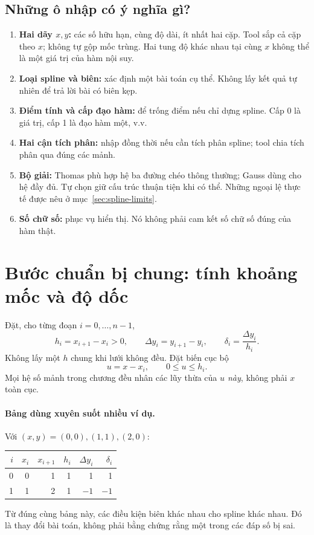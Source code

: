 \subsection{Những ô nhập có ý nghĩa gì?}
\begin{enumerate}
\item \textbf{Hai dãy $x,y$:} các số hữu hạn, cùng độ dài, ít nhất hai cặp. Tool sắp cả cặp theo $x$; không tự gộp mốc trùng. Hai tung độ khác nhau tại cùng $x$ không thể là một giá trị của hàm nội suy.
\item \textbf{Loại spline và biên:} xác định một bài toán cụ thể. Không lấy kết quả tự nhiên để trả lời bài có biên kẹp.
\item \textbf{Điểm tính và cấp đạo hàm:} để trống điểm nếu chỉ dựng spline. Cấp 0 là giá trị, cấp 1 là đạo hàm một, v.v.
\item \textbf{Hai cận tích phân:} nhập đồng thời nếu cần tích phân spline; tool chia tích phân qua đúng các mảnh.
\item \textbf{Bộ giải:} Thomas phù hợp hệ ba đường chéo thông thường; Gauss dùng cho hệ đầy đủ. Tự chọn giữ cấu trúc thuận tiện khi có thể. Những ngoại lệ thực tế được nêu ở mục~\ref{sec:spline-limits}.
\item \textbf{Số chữ số:} phục vụ hiển thị. Nó không phải cam kết số chữ số đúng của hàm thật.
\end{enumerate}

\section{Bước chuẩn bị chung: tính khoảng mốc và độ dốc}
\label{sec:spline-prepare}
Đặt, cho từng đoạn $i=0,\ldots,n-1$,
\[
h_i=x_{i+1}-x_i>0,\qquad
\Delta y_i=y_{i+1}-y_i,\qquad \delta_i=\frac{\Delta y_i}{h_i}.
\]
Không lấy một $h$ chung khi lưới không đều. Đặt biến cục bộ
\[
u=x-x_i,\qquad 0\leq u\leq h_i.
\]
Mọi hệ số mảnh trong chương đều nhân các lũy thừa của \emph{$u$ này}, không phải $x$ toàn cục.

\paragraph{Bảng dùng xuyên suốt nhiều ví dụ.}
Với $(x,y)=(0,0),(1,1),(2,0)$:
\begin{center}
\begin{tabular}{rrrrrr}
\toprule
$i$ & $x_i$ & $x_{i+1}$ & $h_i$ & $\Delta y_i$ & $\delta_i$\\ \midrule
0&0&1&1&1&1\\
1&1&2&1&$-1$&$-1$\\ \bottomrule
\end{tabular}\end{center}
Từ đúng cùng bảng này, các điều kiện biên khác nhau cho spline khác nhau.
Đó là thay đổi bài toán, không phải bằng chứng rằng một trong các đáp số bị sai.

